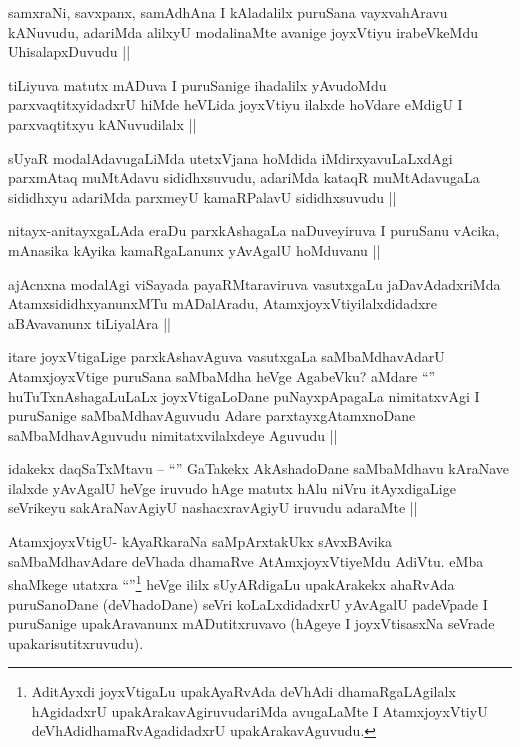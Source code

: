 \begin{artha}
samxraNi, savxpanx, samAdhAna I kAladalilx puruSana vayxvahAravu kANuvudu, adariMda alilxyU modalinaMte avanige joyxVtiyu irabeVkeMdu UhisalapxDuvudu ||
\end{artha}

\begin{artha}
tiLiyuva matutx mADuva I puruSanige ihadalilx yAvudoMdu parxvaqtitxyidadxrU hiMde heVLida joyxVtiyu ilalxde hoVdare eMdigU I parxvaqtitxyu kANuvudilalx ||
\end{artha}

\begin{artha}
sUyaR modalAdavugaLiMda utetxVjana hoMdida iMdirxyavuLaLxdAgi parxmAtaq muMtAdavu sididhxsuvudu, adariMda kataqR muMtAdavugaLa sididhxyu adariMda parxmeyU kamaRPalavU sididhxsuvudu ||
\end{artha}

\begin{artha}
nitayx-anitayxgaLAda eraDu parxkAshagaLa naDuveyiruva I puruSanu vAcika, mAnasika kAyika kamaRgaLanunx yAvAgalU hoMduvanu ||
\end{artha}

\begin{artha}
ajAcnxna modalAgi viSayada payaRMtaraviruva vasutxgaLu jaDavAdadxriMda AtamxsididhxyanunxMTu mADalAradu, AtamxjoyxVtiyilalxdidadxre aBAvavanunx tiLiyalAra ||
\end{artha}

\begin{artha}
itare joyxVtigaLige parxkAshavAguva vasutxgaLa saMbaMdhavAdarU AtamxjoyxVtige puruSana saMbaMdha heVge AgabeVku? aMdare ``\stext'' huTuTxnAshagaLuLaLx joyxVtigaLoDane puNayxpApagaLa nimitatxvAgi I puruSanige saMbaMdhavAguvudu Adare parxtayxgAtamxnoDane saMbaMdhavAguvudu nimitatxvilalxdeye Aguvudu ||
\end{artha}

\begin{artha}
idakekx daqSaTxMtavu -- ``\stext'' GaTakekx AkAshadoDane saMbaMdhavu kAraNave ilalxde yAvAgalU heVge iruvudo hAge matutx hAlu niVru itAyxdigaLige seVrikeyu sakAraNavAgiyU nashacxravAgiyU iruvudu adaraMte ||
\end{artha}

\begin{artha}
AtamxjoyxVtigU- kAyaRkaraNa saMpArxtakUkx sAvxBAvika saMbaMdhavAdare deVhada dhamaRve AtAmxjoyxVtiyeMdu AdiVtu. eMba shaMkege utatxra ``\stext''\footnote{AditAyxdi joyxVtigaLu upakAyaRvAda deVhAdi dhamaRgaLAgilalx hAgidadxrU upakArakavAgiruvudariMda avugaLaMte I AtamxjoyxVtiyU deVhAdidhamaRvAgadidadxrU upakArakavAguvudu.} heVge ililx sUyARdigaLu upakArakekx ahaRvAda puruSanoDane (deVhadoDane) seVri koLaLxdidadxrU yAvAgalU padeVpade I puruSanige upakAravanunx mADutitxruvavo (hAgeye I joyxVtisasxNa seVrade upakarisutitxruvudu).
\end{artha}

